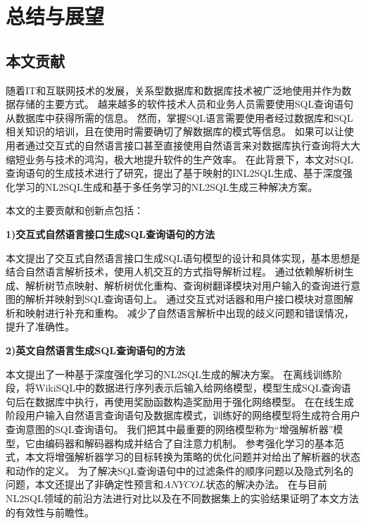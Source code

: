 \chapter{总结与展望}
\label{chap:conculution}
\section{本文贡献}

随着IT和互联网技术的发展，关系型数据库和数据库技术被广泛地使用并作为数据存储的主要方式。
越来越多的软件技术人员和业务人员需要使用SQL查询语句从数据库中获得所需的信息。
然而，掌握SQL语言需要使用者经过数据库和SQL相关知识的培训，且在使用时需要确切了解数据库的模式等信息。
如果可以让使用者通过交互式的自然语言接口甚至直接使用自然语言来对数据库执行查询将大大缩短业务与技术的鸿沟，极大地提升软件的生产效率。
在此背景下，本文对SQL查询语句的生成技术进行了研究，提出了基于映射的INL2SQL生成、基于深度强化学习的NL2SQL生成和基于多任务学习的NL2SQL生成三种解决方案。

本文的主要贡献和创新点包括：

\textbf{1)交互式自然语言接口生成SQL查询语句的方法}

本文提出了交互式自然语言接口生成SQL语句模型的设计和具体实现，基本思想是结合自然语言解析技术，使用人机交互的方式指导解析过程。
通过依赖解析树生成、解析树节点映射、解析树优化重构、查询树翻译模块对用户输入的查询进行意图的解析并映射到SQL查询语句上。
通过交互式对话器和用户接口模块对意图解析和映射进行补充和重构。
减少了自然语言解析中出现的歧义问题和错误情况，提升了准确性。


\textbf{2)英文自然语言生成SQL查询语句的方法}

本文提出了一种基于深度强化学习的NL2SQL生成的解决方案。
在离线训练阶段，将WikiSQL中的数据进行序列表示后输入给网络模型，模型生成SQL查询语句后在数据库中执行，再使用奖励函数构造奖励用于强化网络模型。
在在线生成阶段用户输入自然语言查询语句及数据库模式，训练好的网络模型将生成符合用户查询意图的SQL查询语句。
我们把其中最重要的网络模型称为“增强解析器”模型，它由编码器和解码器构成并结合了自注意力机制。
参考强化学习的基本范式，本文将增强解析器学习的目标转换为策略的优化问题并对给出了解析器的状态和动作的定义。
为了解决SQL查询语句中的过滤条件的顺序问题以及隐式列名的问题，本文还提出了非确定性预言和$ANYCOL$状态的解决办法。
在与目前NL2SQL领域的前沿方法进行对比以及在不同数据集上的实验结果证明了本文方法的有效性与前瞻性。

